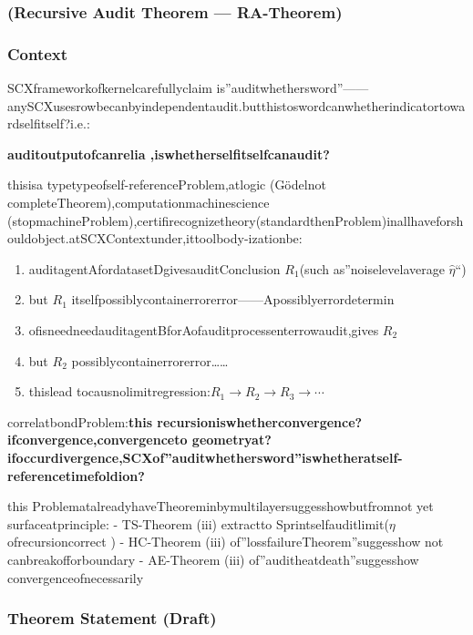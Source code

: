 \documentclass[
  12pt,
]{article}
\providecommand{\tightlist}{%
  \setlength{\itemsep}{0pt}\setlength{\parskip}{0pt}}
\begin{document}
\subsubsection{(Recursive Audit Theorem ---
RA-Theorem)}\label{recursive-audit-theorem-ra-theorem}

\subsubsection{Context}\label{ux8bedux5883-3}

SCXframeworkofkernelcarefullyclaim is''auditwhethersword''------anySCXusesrowbecanbyindependentaudit.butthistoswordcanwhetherindicatortowardselfitself?i.e.:

\textbf{auditoutputofcanrelia ,iswhetherselfitselfcanaudit?}

thisisa  typetypeofself-referenceProblem,atlogic  (Gödelnot completeTheorem),computationmachinescience (stopmachineProblem),certifirecognizetheory(standardthenProblem)inallhaveforshouldobject.atSCXContextunder,ittoolbody-izationbe:

\begin{enumerate}
\def\labelenumi{\arabic{enumi}.}
\tightlist
\item
  auditagentAfordatasetDgivesauditConclusion \(R_1\)(such as''noiselevelaverage \(\hat{\eta}\)``)
\item
  but \(R_1\)  itselfpossiblycontainerrorerror------Apossiblyerrordetermin
\item
  ofisneedneedauditagentBforAofauditprocessenterrowaudit,gives \(R_2\)
\item
  but \(R_2\) possiblycontainerrorerror\ldots\ldots{}
\item
  thislead tocausnolimitregression:\(R_1 \to R_2 \to R_3 \to \cdots\)
\end{enumerate}

correlatbondProblem:\textbf{this recursioniswhetherconvergence?ifconvergence,convergenceto geometryat?ifoccurdivergence,SCXof''auditwhethersword''iswhetheratself-referencetimefoldion?}

this ProblematalreadyhaveTheoreminbymultilayersuggesshowbutfromnot yet surfaceatprinciple: - TS-Theorem (iii)
extractto Sprintselfauditlimit(\(\eta\)ofrecursioncorrect ) - HC-Theorem (iii)
of''lossfailureTheorem''suggesshow not canbreakofforboundary - AE-Theorem (iii)
of''auditheatdeath''suggesshow convergenceofnecessarily 

\subsubsection{Theorem Statement (Draft)}\label{ux5b9aux7406ux9648ux8ff0ux8349ux6848-3}
\end{document}

